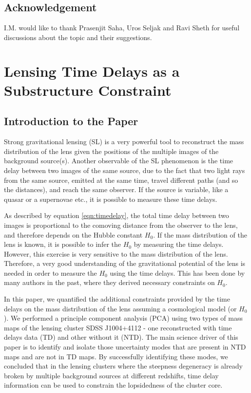 \documentclass[
  11pt,
  twoside,
  openright,
  titlepage,
  headings=optiontoheadandtoc
]{scrbook}
\begin{document}
\section{Acknowledgement}
I.M. would like to thank Prasenjit Saha, Uros Seljak and Ravi Sheth for useful discussions about the topic and their suggestions.

\chapter{Lensing Time Delays as a Substructure Constraint}
\label{p4:chap:time-delay-substructure}

\section{Introduction to the Paper}

Strong gravitational lensing (SL) is a very powerful tool to reconstruct the mass distribution
of the lens given the positions of the multiple images of the background source(s). 
Another observable
of the SL phenomenon is the time delay between two images of the same source,
due to the fact that two light rays from the same source, emitted at the
same time, travel different paths (and so the distances), and reach the same observer. 
If the source is variable, like a quasar or a supernovae etc., 
it is possible to measure these time delays. 

As described by equation \ref{eqn:timedelay}, 
the total time delay between two images 
is proportional to the comoving distance from the observer to the lens, 
and therefore depends
on the Hubble constant $H_0$. If the mass distribution of the lens
is known, it is possible to infer the $H_0$ by measuring the time delays.
However, this exercise is very sensitive to the mass distribution of the 
lens. Therefore, a very good understanding of the gravitational potential
of the lens is needed in order to measure the $H_0$ using the time delays.
This has been done by many authors in the past, where they derived necessary
constraints on $H_0$.

In this paper, we quantified the additional constraints provided by the time delays
on the mass distribution of the lens assuming a cosmological model (or $H_0$). 
We performed a principle component analysis (PCA)
using two types of mass maps of the lensing cluster SDSS J1004+4112 - one 
reconstructed with time delays data (TD) and other without it (NTD). The main
science driver of this paper is to identify and isolate those 
uncertainty modes that are present in NTD maps and are not in TD maps.
By successfully identifying these modes, we concluded that in the lensing clusters
where the steepness degeneracy is already broken by multiple background sources
at different redshifts, time delay information can be used to constrain
the lopsidedness of the cluster core.
\end{document}
